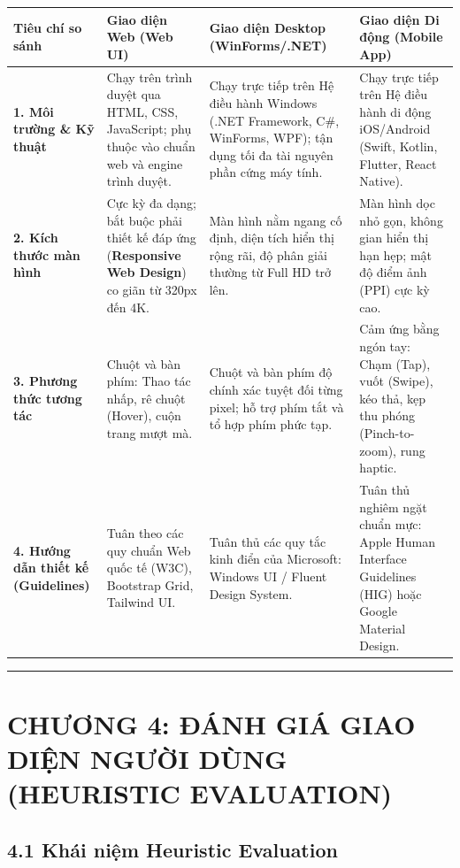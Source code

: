 \documentclass[11pt,a4paper,oneside]{report}
\begin{document}
\begin{table}[htbp]
\centering
\begin{tabularx}{\textwidth}{p{} p{} p{} p{}}
\toprule
\textbf{Tiêu chí so sánh} & \textbf{Giao diện Web (Web UI)} & \textbf{Giao diện Desktop (WinForms/.NET)} & \textbf{Giao diện Di động (Mobile App)} \\
\midrule
\textbf{1. Môi trường \& Kỹ thuật} & Chạy trên trình duyệt qua HTML, CSS, JavaScript; phụ thuộc vào chuẩn web và engine trình duyệt. & Chạy trực tiếp trên Hệ điều hành Windows (.NET Framework, C\#, WinForms, WPF); tận dụng tối đa tài nguyên phần cứng máy tính. & Chạy trực tiếp trên Hệ điều hành di động iOS/Android (Swift, Kotlin, Flutter, React Native). \\
\textbf{2. Kích thước màn hình} & Cực kỳ đa dạng; bắt buộc phải thiết kế đáp ứng (\textbf{Responsive Web Design}) co giãn từ 320px đến 4K. & Màn hình nằm ngang cố định, diện tích hiển thị rộng rãi, độ phân giải thường từ Full HD trở lên. & Màn hình dọc nhỏ gọn, không gian hiển thị hạn hẹp; mật độ điểm ảnh (PPI) cực kỳ cao. \\
\textbf{3. Phương thức tương tác} & Chuột và bàn phím: Thao tác nhấp, rê chuột (Hover), cuộn trang mượt mà. & Chuột và bàn phím độ chính xác tuyệt đối từng pixel; hỗ trợ phím tắt và tổ hợp phím phức tạp. & Cảm ứng bằng ngón tay: Chạm (Tap), vuốt (Swipe), kéo thả, kẹp thu phóng (Pinch-to-zoom), rung haptic. \\
\textbf{4. Hướng dẫn thiết kế (Guidelines)} & Tuân theo các quy chuẩn Web quốc tế (W3C), Bootstrap Grid, Tailwind UI. & Tuân thủ các quy tắc kinh điển của Microsoft: Windows UI / Fluent Design System. & Tuân thủ nghiêm ngặt chuẩn mực: Apple Human Interface Guidelines (HIG) hoặc Google Material Design. \\
\bottomrule
\end{tabularx}
\end{table}


\bigskip\hrule\bigskip

\chapter{CHƯƠNG 4: ĐÁNH GIÁ GIAO DIỆN NGƯỜI DÙNG (HEURISTIC EVALUATION)}

\section{4.1 Khái niệm Heuristic Evaluation}
\end{document}
